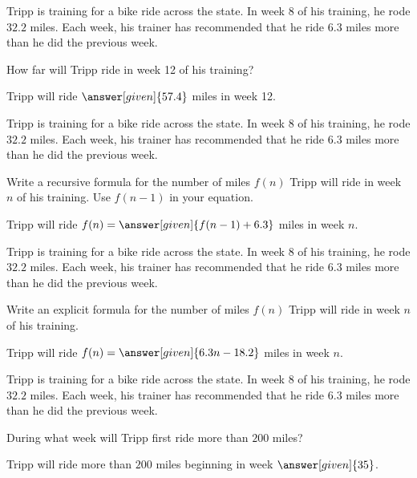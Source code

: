 \documentclass[nooutcomes]{ximera}
\begin{document}
\begin{problem}
Tripp is training for a bike ride across the state.  In week 8 of his training, he rode $32.2$ miles.  Each week, his trainer has recommended that he ride $6.3$ miles more than he did the previous week.

How far will Tripp ride in week 12 of his training?

\begin{prompt}
Tripp will ride $\answer[given]{57.4}$ miles in week 12.
\end{prompt}
\end{problem}



\begin{problem}
Tripp is training for a bike ride across the state.  In week 8 of his training, he rode $32.2$ miles.  Each week, his trainer has recommended that he ride $6.3$ miles more than he did the previous week.

Write a recursive formula for the number of miles $f(n)$ Tripp will ride in week $n$ of his training.  Use $f(n-1)$ in your equation.

\begin{prompt}
Tripp will ride $f(n) = \answer[given]{f(n-1) + 6.3}$ miles in week $n$.
\end{prompt}
\end{problem}



\begin{problem}
Tripp is training for a bike ride across the state.  In week 8 of his training, he rode $32.2$ miles.  Each week, his trainer has recommended that he ride $6.3$ miles more than he did the previous week.

Write an explicit formula for the number of miles $f(n)$ Tripp will ride in week $n$ of his training.

\begin{prompt}
Tripp will ride $f(n) = \answer[given]{6.3n-18.2}$ miles in week $n$.
\end{prompt}
\end{problem}




\begin{problem}
Tripp is training for a bike ride across the state.  In week 8 of his training, he rode $32.2$ miles.  Each week, his trainer has recommended that he ride $6.3$ miles more than he did the previous week.

During what week will Tripp first ride more than $200$ miles?

\begin{prompt}
Tripp will ride more than $200$ miles beginning in week $\answer[given]{35}$.
\end{prompt}
\end{problem}
\end{document}
